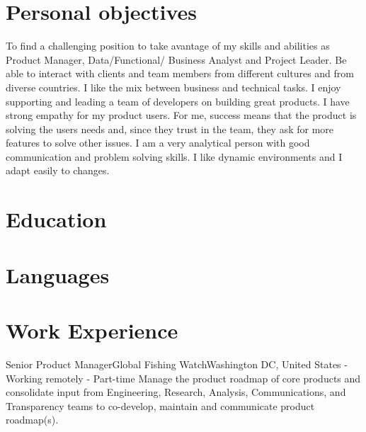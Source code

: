 \documentclass[11pt,a4paper,sans]{moderncv}
\begin{document}
\makecvtitle

\section{Personal objectives}

To find a challenging position to take avantage of my skills and abilities as Product Manager, Data/Functional/ Business Analyst
and Project Leader. Be able to interact with clients and team members from different cultures and from diverse countries. I like the mix between business and technical tasks. I enjoy supporting and leading a team of developers on building great products. I have strong empathy for my product users. For me, success means that the product is solving the users needs and, since they trust in the team, they ask for more features to solve other issues.
I am a very analytical person with good communication and problem solving skills. I like dynamic environments and I adapt easily to changes.
\section{Education}




\section{Languages}



\section{Work Experience}
 {Senior Product Manager}{Global Fishing Watch}{Washington DC, United States - Working remotely - Part-time }{}{}{}
  Manage the product roadmap of core products and consolidate input from Engineering, Research, Analysis, Communications, and Transparency teams to co-develop, maintain and communicate product roadmap(s).
\\
\end{document}
